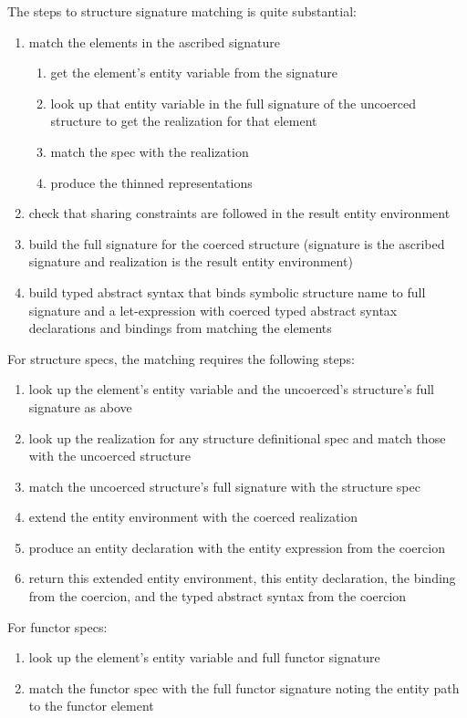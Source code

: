 The steps to structure signature matching is quite substantial:
\begin{enumerate}
\item match the elements in the ascribed signature 
  \begin{enumerate}
  \item get the element's entity variable from the signature
  \item look up that entity variable in the full signature of the uncoerced structure to get the realization for that element
  \item match the spec with the realization
  \item produce the thinned representations
  \end{enumerate}
\item check that sharing constraints are followed in the result entity environment
\item build the full signature for the coerced structure (signature is the ascribed signature and realization is the result entity environment)
\item build typed abstract syntax that binds symbolic structure name to full signature and a let-expression with coerced typed abstract syntax declarations and bindings from matching the elements
\end{enumerate}
      
For structure specs, the matching requires the following steps:
\begin{enumerate}
\item look up the element's entity variable and the uncoerced's structure's full signature as above
\item look up the realization for any structure definitional spec and match those with the uncoerced structure
\item match the uncoerced structure's full signature with the structure spec
\item extend the entity environment with the coerced realization
\item produce an entity declaration with the entity expression from the coercion
\item return this extended entity environment, this entity declaration, the binding from the coercion, and the typed abstract syntax from the coercion
\end{enumerate}

For functor specs:
\begin{enumerate}
\item look up the element's entity variable and full functor signature
\item match the functor spec with the full functor signature noting the entity path to the functor element
\end{enumerate}

